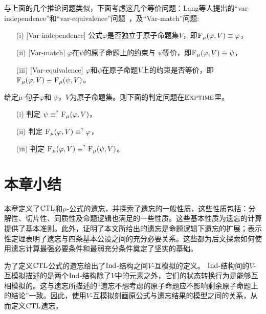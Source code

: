 与上面的几个推论问题类似，下面考虑这几个等价问题：Lang等人提出的“var-independence”和“var-equivalence”问题~\cite{DBLP:journals/jair/LangLM03}，及“Var-match”问题:
\begin{itemize}
	\item[(i)] $[$Var-independence$]$ 公式$\varphi$是否独立于原子命题集$V$，即${\textsc{F}_{\textsc{$\mu$}}}(\varphi,V) \equiv \varphi$，
	\item[(ii)] $[$Var-match$]$  $\varphi$在$\psi$的原子命题上的约束与 $\psi$等价，即${\textsc{F}_{\textsc{$\mu$}}}(\varphi, V) \equiv \psi$，
	\item[(iii)] $[$Var-equivalence$]$  $\varphi$和$\psi$在原子命题$V$上的约束是否等价，即${\textsc{F}_{\textsc{$\mu$}}}(\varphi, V) \equiv {\textsc{F}_{\textsc{$\mu$}}}(\psi, V)$。
\end{itemize}

\begin{corollary}\label{chapter06:cor:equiv}
	给定$\mu$-句子$\varphi$和 $\psi$，$V$为原子命题集。则下面的判定问题在$\textsc{Exptime}$里。
	\begin{itemize}
		\item[(i)] 判定 $\psi \equiv^?{\textsc{F}_{\textsc{$\mu$}}}(\varphi, V)$，
		\item[(ii)] 判定 ${\textsc{F}_{\textsc{$\mu$}}}(\varphi, V) \equiv^? \varphi$，
		\item[(iii)] 判定 ${\textsc{F}_{\textsc{$\mu$}}}(\varphi, V) \equiv^? {\textsc{F}_{\textsc{$\mu$}}}(\psi, V)$。
	\end{itemize}
\end{corollary}


\section{本章小结}
本章定义了$\textrm{CTL}$和$\mu$-公式的遗忘，并探索了遗忘的一般性质，这些性质包括：分解性、切片性、同质性及命题逻辑也满足的一些性质。这些基本性质为遗忘的计算提供了基本准则。此外，证明了本文所给出的遗忘是命题逻辑下遗忘的扩展；表示性定理表明了遗忘与四条基本公设之间的充分必要关系。这些都为后文探索如何使用遗忘计算最强必要条件和最弱充分条件奠定了坚实的基础。

为了定义$\textrm{CTL}$公式的遗忘给出了$\textrm{Ind}$-结构之间$V$-互模拟的定义。
$\textrm{Ind}$-结构间的$V$-互模拟描述的是两个$\textrm{Ind}$-结构除了$V$中的元素之外，它们的状态转换行为是能够互相模拟的。这与遗忘所描述的“遗忘不想考虑的原子命题应不影响剩余原子命题上的结论”一致。因此，使用$V$-互模拟刻画原公式与遗忘结果的模型之间的关系，从而定义$\textrm{CTL}$遗忘。


